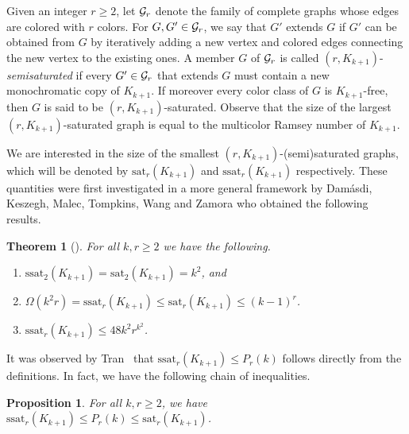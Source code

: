 \documentclass[12pt]{article}
\newcommand{\cG}{{\cal G}}
\newtheorem{theorem}{Theorem}
\newtheorem{proposition}{Proposition}
\theoremstyle{definition}
\begin{document}
	Given an integer $r \geq 2$, let $\cG_r$ denote the family of complete graphs whose edges are colored with $r$ colors. For $G, G' \in \cG_r$, we say that $G'$ extends $G$ if $G'$ can be obtained from $G$ by iteratively adding a new vertex and colored edges connecting the new vertex to the existing ones. A member $G$ of $\cG_r$ is called $(r,K_{k+1})$-\textit{semisaturated} if every $G' \in \cG_r$ that extends $G$ must contain a new monochromatic copy of $K_{k+1}$. If moreover every color class of $G$ is $K_{k+1}$-free, then $G$ is said to be $(r,K_{k+1})$-saturated. Observe that the size of the largest $(r,K_{k+1})$-saturated graph is equal to the multicolor Ramsey number of $K_{k+1}$. 
	
	We are interested in the size of the smallest $(r,K_{k+1})$-(semi)saturated graphs, which will be denoted by $\mathrm{sat}_r(K_{k+1})$ and $\mathrm{ssat}_r(K_{k+1})$ respectively. These quantities were first investigated in a more general framework by Dam\'asdi, Keszegh, Malec, Tompkins, Wang and Zamora \cite{Damasdietal21} who obtained the following results.
	
	\begin{theorem}[\cite{Damasdietal21}]
		For all $k,r \geq 2$ we have the following.
		\begin{enumerate}
			\item $\mathrm{ssat}_2(K_{k+1}) = \mathrm{sat}_2(K_{k+1}) = k^2$, and
			\item $\Omega(k^2r) = \mathrm{ssat}_r(K_{k+1}) \leq \mathrm{sat}_r(K_{k+1}) \leq (k-1)^r$.
			\item $\mathrm{ssat}_r(K_{k+1}) \leq 48k^2r^{k^2}$.
		\end{enumerate}
	\end{theorem}
	
	It was observed by Tran~\cite{tran2022two} that $\mathrm{ssat}_r(K_{k+1}) \leq P_r(k)$ follows directly from the definitions. In fact, we have the following chain of inequalities.
	
	\begin{proposition}\label{prop:saturationinequalities}
		For all $k,r \geq 2$, we have $\mathrm{ssat}_r(K_{k+1}) \leq P_r(k) \leq \mathrm{sat}_r(K_{k+1})$.	
	\end{proposition}	
	
\end{document}
